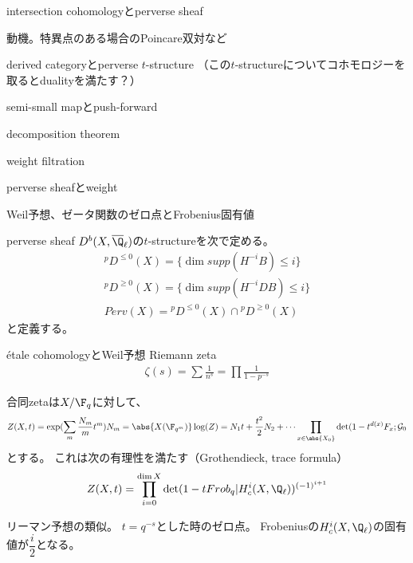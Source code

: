 \documentclass[dvipdfmx]{beamer}
\begin{document}
\begin{frame}{intersection cohomologyとperverse sheaf}

動機。特異点のある場合のPoincare双対など

derived categoryとperverse $t$-structure
（この$t$-structureについてコホモロジーを取るとdualityを満たす？）

semi-small mapとpush-forward

decomposition theorem

weight filtration

perverse sheafとweight

Weil予想、ゼータ関数のゼロ点とFrobenius固有値
\end{frame}

\begin{frame}{perverse sheaf}
$D^b(X,\overline{\Q}_\ell)$の$t$-structureを次で定める。
\begin{align*}
{}^pD^{\leq 0}(X)=\{\dim supp(H^{-i}B)\leq i\}\\
{}^pD^{\geq 0}(X)=\{\dim supp(H^{-i}DB)\leq i\}\\
Perv(X)={}^pD^{\leq0}(X)\cap{}^pD^{\geq0}(X)
\end{align*}
と定義する。
\end{frame}

\begin{frame}{\'etale cohomologyとWeil予想}
Riemann zeta
\begin{align*}
\zeta(s)=\sum\frac{1}{n^s}=\prod\frac{1}{1-p^{-s}}
\end{align*}

合同zetaは$X/\F_q$に対して、
\begin{align*}
Z(X,t)=\exp(\sum_m\frac{N_m}{m}t^m)
N_m=\abs{X(\F_{q^m})}
\log(Z)=N_1t+\frac{t^2}{2}N_2+\cdots
\prod_{x\in\abs{X_0}}\det(1-t^{d(x)}F_x;\mathcal{G}_0
\end{align*}
とする。
これは次の有理性を満たす（Grothendieck, trace formula）
\begin{align*}
Z(X,t)=\prod_{i=0}^{\dim X}\det(1-tFrob_q\vert H^i_c(X,\Q_\ell))^{(-1)^{i+1}}
\end{align*}

リーマン予想の類似。
$t=q^{-s}$とした時のゼロ点。
Frobeniusの$H^i_c(X,\Q_\ell)$の固有値が$\dfrac{i}{2}$となる。
\end{frame}
\end{document}
